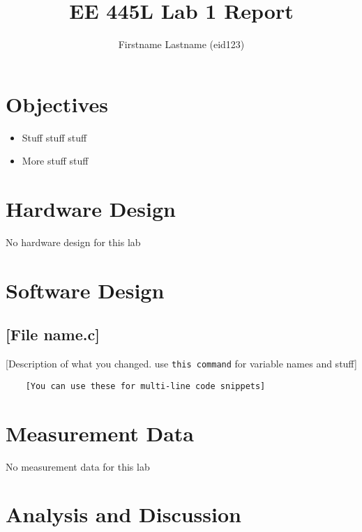 \documentclass{article}
\title{EE 445L Lab 1 Report}
\author{Firstname Lastname (eid123)} %
\begin{document}
\maketitle

\section{Objectives} %
\begin{itemize}
	\item Stuff stuff stuff
	\item More stuff stuff
\end{itemize}

\section{Hardware Design}
No hardware design for this lab

\section{Software Design} %

\subsection{[File name.c]} %
[Description of what you changed. use \verb|this command| for variable names and stuff]

\begin{framed}\begin{verbatim}
	[You can use these for multi-line code snippets]
\end{verbatim}\end{framed}

\section{Measurement Data}
No measurement data for this lab

\section{Analysis and Discussion} %
\end{document}
